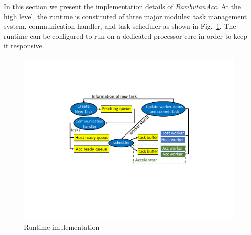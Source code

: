 In this section we present the implementation details of {\em RambutanAcc}.
At the high level, the runtime is constituted of three major modules: task management system, communication handler, and task scheduler as shown in Fig.~\ref{fig:impl}. 
The runtime can be configured to run on a dedicated processor core in order to keep it responsive.

\begin{figure}[htb]
\centering
\includegraphics[width=.49\textwidth]{figures/impl.pdf}
\caption{Runtime implementation}
\label{fig:impl}
\end{figure}

